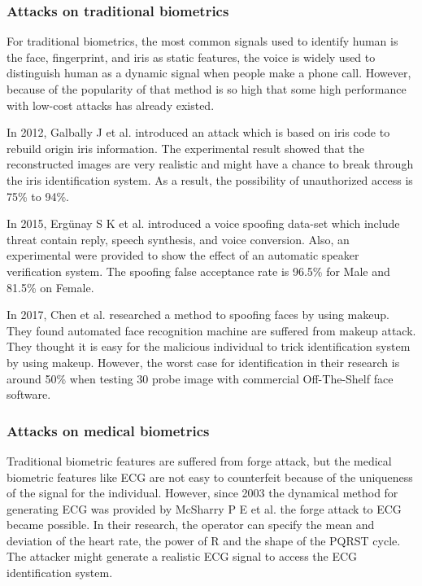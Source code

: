 \documentclass[a4paper,12pt]{article}
\begin{document}
\subsubsection{Attacks on traditional biometrics}
For traditional biometrics, the most common signals used to identify human is the face, fingerprint, and iris as static features, the voice is widely used to distinguish human as a dynamic signal when people make a phone call. However, because of the popularity of that method is so high that some high performance with low-cost attacks has already existed.

In 2012, Galbally J et al.  \autocite{Galbally:2012iriscode} introduced an attack which is based on iris code to rebuild origin iris information. The experimental result showed that the reconstructed images are very realistic and might have a chance to break through the iris identification system. As a result, the possibility of unauthorized access is 75\% to 94\%.

In 2015, Ergünay S K et al.  \autocite{Ergunay:2015voicevulnerability} introduced a voice spoofing data-set which include threat contain reply, speech synthesis, and voice conversion. Also, an experimental were provided to show the effect of an automatic speaker verification system. The spoofing false acceptance rate is 96.5\% for Male and 81.5\% on Female.

In 2017, Chen et al.  \autocite{Chen:2017spoofing}researched a method to spoofing faces by using makeup. They found automated face recognition machine are suffered from makeup attack. They thought it is easy for the malicious individual to trick identification system by using makeup. However, the worst case for identification in their research is around 50\% when testing 30 probe image with commercial Off-The-Shelf face software.

\subsubsection{Attacks on medical biometrics}
Traditional biometric features are suffered from forge attack, but the medical biometric features like ECG are not easy to counterfeit because of the uniqueness of the signal for the individual. However, since 2003 the dynamical method for generating ECG was provided by McSharry P E et al.  \autocite{Mcsharry:2003dynamical} the forge attack to ECG became possible. In their research, the operator can specify the mean and deviation of the heart rate, the power of R and the shape of the PQRST cycle. The attacker might generate a realistic ECG signal to access the ECG identification system.
\end{document}
